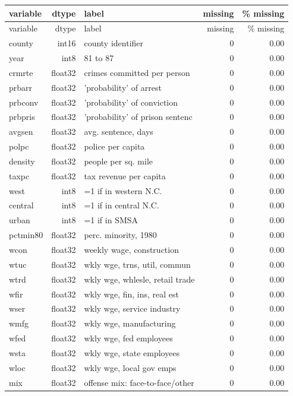 \begin{longtable}{p{} r p{} r r}
\toprule
variable & dtype & label & missing & \% missing \\
\midrule
\endfirsthead
\toprule
variable & dtype & label & missing & \% missing \\
\midrule
\endhead
county & int16 & county identifier & 0 & 0.00 \\
year & int8 & 81 to 87 & 0 & 0.00 \\
crmrte & float32 & crimes committed per person & 0 & 0.00 \\
prbarr & float32 & 'probability' of arrest & 0 & 0.00 \\
prbconv & float32 & 'probability' of conviction & 0 & 0.00 \\
prbpris & float32 & 'probability' of prison sentenc & 0 & 0.00 \\
avgsen & float32 & avg. sentence, days & 0 & 0.00 \\
polpc & float32 & police per capita & 0 & 0.00 \\
density & float32 & people per sq. mile & 0 & 0.00 \\
taxpc & float32 & tax revenue per capita & 0 & 0.00 \\
west & int8 & =1 if in western N.C. & 0 & 0.00 \\
central & int8 & =1 if in central N.C. & 0 & 0.00 \\
urban & int8 & =1 if in SMSA & 0 & 0.00 \\
pctmin80 & float32 & perc. minority, 1980 & 0 & 0.00 \\
wcon & float32 & weekly wage, construction & 0 & 0.00 \\
wtuc & float32 & wkly wge, trns, util, commun & 0 & 0.00 \\
wtrd & float32 & wkly wge, whlesle, retail trade & 0 & 0.00 \\
wfir & float32 & wkly wge, fin, ins, real est & 0 & 0.00 \\
wser & float32 & wkly wge, service industry & 0 & 0.00 \\
wmfg & float32 & wkly wge, manufacturing & 0 & 0.00 \\
wfed & float32 & wkly wge, fed employees & 0 & 0.00 \\
wsta & float32 & wkly wge, state employees & 0 & 0.00 \\
wloc & float32 & wkly wge, local gov emps & 0 & 0.00 \\
mix & float32 & offense mix: face-to-face/other & 0 & 0.00 \\

\end{longtable}

